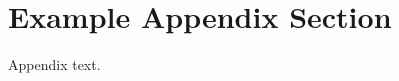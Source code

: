 \documentclass[preprint,12pt]{elsarticle}
\begin{document}


\appendix
\section{Example Appendix Section}
\label{app1}

Appendix text.





 



\end{document}
